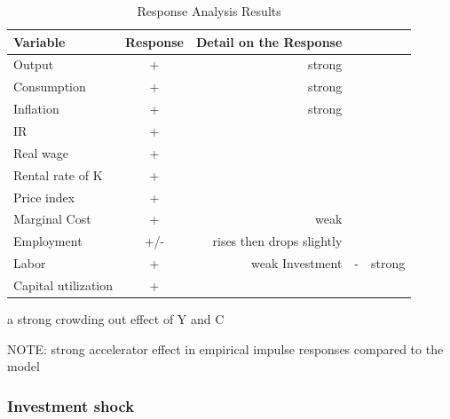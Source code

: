 \documentclass{article}
\begin{document}
\begin{table}[H]    
    \centering  
    \begin{threeparttable}    
    \caption{Response Analysis Results}    
    \label{tab:response_analysis}    
    \begin{tabular}{lcr}    
        \toprule    
        \textbf{Variable} & \textbf{Response} & \textbf{Detail on the Response} \\    
        \midrule    
        Output & + & strong \\    
        Consumption & + & strong \\ 
        Inflation & + & strong \\
        IR & + & \\   
        Real wage & + & \\  
        Rental rate of K & + & \\
        Price index & + & \\
        Marginal Cost & + & weak \\
        Employment & +/- &  rises then drops slightly\\   
        Labor & + & weak
        Investment & - & strong \\
        Capital utilization & + & \\
        \bottomrule    
    \end{tabular}  
    \begin{tablenotes}  
        \small  
        \item[a] strong crowding out effect of Y and C
    \end{tablenotes}  
    \end{threeparttable}    
\end{table} 
NOTE: strong accelerator effect in empirical impulse responses compared to the model

\subsubsection{Investment shock}
\end{document}
